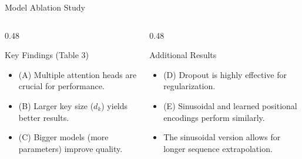 \documentclass[
	11pt,
	aspectratio=169,
]{beamer}
\begin{document}
\begin{frame}{Model Ablation Study}
    \begin{columns}[T,onlytextwidth]
    \begin{column}{0.48\textwidth}
        \begin{block}{Key Findings (Table 3)}
            \begin{itemize}
                \item (A) Multiple attention heads are crucial for performance.
                \item (B) Larger key size ($d_k$) yields better results.
                \item (C) Bigger models (more parameters) improve quality.
            \end{itemize}
        \end{block}
    \end{column}
    \begin{column}{0.48\textwidth}
        \begin{block}{Additional Results}
            \begin{itemize}
                \item (D) Dropout is highly effective for regularization.
                \item (E) Sinusoidal and learned positional encodings perform similarly.
                \item The sinusoidal version allows for longer sequence extrapolation.
            \end{itemize}
        \end{block}
    \end{column}
\end{columns}
\end{frame}
\end{document}
